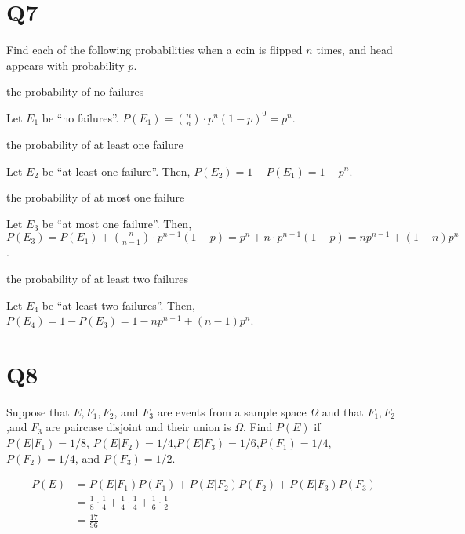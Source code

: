 \documentclass[11pt]{article}
\begin{document}
\section*{Q7}
Find each of the following probabilities when a coin is ﬂipped $n$
times, and head appears with probability $p$.
\begin{qparts}
    
    \item the probability of no failures
    \begin{solution}
        Let $E_1$ be ``no failures''. $P(E_1)=
        \binom{n }{n }\cdot p^{n }(1-p)^{0}=p^{n}$.
    \end{solution}
    \item the probability of at least one failure
    \begin{solution}
        Let $E_2$ be ``at least one failure''. 
        Then, $P(E_2)=1-P(E_1)=1-p^{n}$.
    \end{solution}
    \item the probability of at most one failure
    \begin{solution}
        Let $E_3$ be ``at most one failure''.
        Then, $P(E_3)=P(E_1)+\binom{n }{n-1}\cdot p^{n-1}(1-p)
        =p ^{n}+n\cdot p^{n-1}(1-p)=np^{n-1}+(1-n)p^{n}$.
    \end{solution}
    \item the probability of at least two failures
    \begin{solution}
        Let $E_4$ be ``at least two failures''. Then,
        $P(E_4)=1-P(E_3)=1-np^{n-1}+(n-1)p^{n}$.
    \end{solution}
\end{qparts}

\section*{Q8}
Suppose that $E,F_1,F_2$, and $F_3$ are events from a sample space 
$\Omega$ and that $F_1,F_2$,and $F_3$ are paircase disjoint and their
union is $\Omega$. Find $P(E)$ if $P(E \vert F_1)=1 / 8 $,
$P(E\vert F_2)=1 / 4$,$P(E \vert F_3)=1 / 6$,$P(F_1)=1 / 4$,
$P(F_2)=1 / 4$, and $P(F_3)=1 / 2$.
\begin{solution}
\begin{align*}
    P(E)&=P(E \vert F_1)P(F_1)+P(E \vert F_2)P(F_2)+P(E \vert F_3)P(F_3)\\
    &=\frac{1}{8}\cdot \frac{1}{4}+\frac{1}{4}\cdot \frac{1}{4}+\frac{1}{6}\cdot \frac{1}{2}\\
    &=\frac{17}{96}
\end{align*}
\end{solution}
\end{document}
